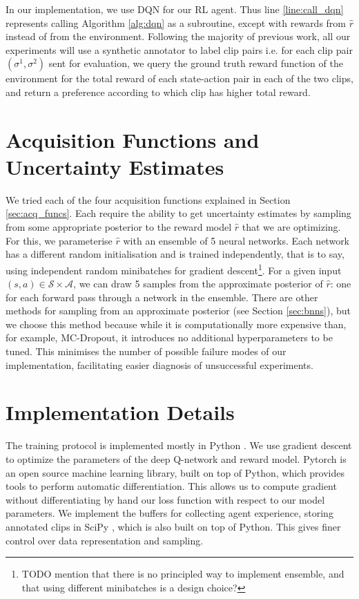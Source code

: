 \documentclass[11pt, a4paper, bibliography=totoc]{report}
\newcommand{\rp}{\hat{r}}
\begin{document}
In our implementation, we use DQN for our RL agent. Thus line \ref{line:call_dqn} represents calling Algorithm \ref{alg:dqn} as a subroutine, except with rewards from $ \rp $ instead of from the environment. Following the majority of previous work, all our experiments will use a synthetic annotator to label clip pairs i.e. for each clip pair $ (\sigma^1, \sigma^2) $ sent for evaluation, we query the ground truth reward function of the environment for the total reward of each state-action pair in each of the two clips, and return a preference according to which clip has higher total reward.

\section{Acquisition Functions and Uncertainty Estimates}
We tried each of the four acquisition functions explained in Section \ref{sec:acq_funcs}. Each require the ability to get uncertainty estimates by sampling from some appropriate posterior to the reward model $ \rp $ that we are optimizing. For this, we parameterise $ \rp $ with an ensemble of 5 neural networks. Each network has a different random initialisation and is trained independently, that is to say, using independent random minibatches for gradient descent\footnote{TODO mention that there is no principled way to implement ensemble, and that using different minibatches is a design choice?}. For a given input $ (s,a) \in \mathcal{S} \times \mathcal{A} $, we can draw 5 samples from the approximate posterior of $ \rp $: one for each forward pass through a network in the ensemble. There are other methods for sampling from an approximate posterior (see Section \ref{sec:bnns}), but we choose this method because while it is computationally more expensive than, for example, MC-Dropout, it introduces no additional hyperparameters to be tuned. This minimises the number of possible failure modes of our implementation, facilitating easier diagnosis of unsuccessful experiments.

\section{Implementation Details}
The training protocol is implemented mostly in Python \cite{van1995python}. We use gradient descent to optimize the parameters of the deep Q-network and reward model. Pytorch \cite{paszke2017automatic} is an open source machine learning library, built on top of Python, which provides tools to perform automatic differentiation. This allows us to compute gradient without differentiating by hand our loss function with respect to our model parameters. We implement the buffers for collecting agent experience, storing annotated clips in SciPy \cite{jones2001}, which is also built on top of Python. This gives finer control over data representation and sampling.
\end{document}
